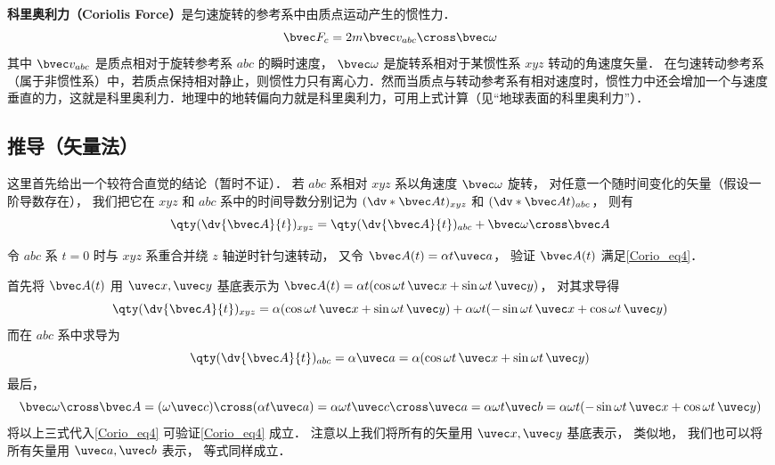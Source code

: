 
\textbf{科里奥利力（Coriolis Force）}是匀速旋转的参考系中由质点运动产生的惯性力．
\begin{equation}
\bvec F_c = 2m \bvec v_{abc} \cross \bvec \omega
\end{equation}
其中 $\bvec v_{abc}$ 是质点相对于旋转参考系 $abc$ 的瞬时速度， $\bvec\omega$ 是旋转系相对于某惯性系 $xyz$ 转动的角速度矢量．%
在匀速转动参考系（属于非惯性系）中，若质点保持相对静止，则惯性力只有离心力．然而当质点与转动参考系有相对速度时，惯性力中还会增加一个与速度垂直的力，这就是科里奥利力．地理中的地转偏向力就是科里奥利力，可用上式计算（见“地球表面的科里奥利力”）．

\subsection{推导（矢量法）}

这里首先给出一个较符合直觉的结论（暂时不证）． 若 $abc$ 系相对 $xyz$ 系以角速度 $\bvec\omega$ 旋转， 对任意一个随时间变化的矢量（假设一阶导数存在）， 我们把它在 $xyz$ 和 $abc$ 系中的时间导数分别记为 $(\dv*{\bvec A}{t})_{xyz}$ 和 $(\dv*{\bvec A}{t})_{abc}$， 则有
\begin{equation}\label{Corio_eq4}
\qty(\dv{\bvec A}{t})_{xyz} = \qty(\dv{\bvec A}{t})_{abc} + \bvec\omega\cross\bvec A
\end{equation}

\begin{example}{}
令 $abc$ 系 $t = 0$ 时与 $xyz$ 系重合并绕 $z$ 轴逆时针匀速转动， 又令 $\bvec A(t) = \alpha t \uvec a$， 验证 $\bvec A(t)$ 满足\autoref{Corio_eq4}．

首先将 $\bvec A(t)$ 用 $\uvec x, \uvec y$ 基底表示为 $\bvec A(t) = \alpha t (\cos\omega t\, \uvec x + \sin\omega t\, \uvec y)$， 对其求导得
\begin{equation}
\qty(\dv{\bvec A}{t})_{xyz} = \alpha (\cos\omega t \,\uvec x + \sin\omega t \,\uvec y)
+ \alpha\omega t (-\sin\omega t \,\uvec x + \cos\omega t \,\uvec y)
\end{equation}
而在 $abc$ 系中求导为
\begin{equation}
\qty(\dv{\bvec A}{t})_{abc} = \alpha \uvec a = \alpha (\cos\omega t\, \uvec x + \sin\omega t \,\uvec y)
\end{equation}
最后，
\begin{equation}
\bvec\omega \cross \bvec A = (\omega \uvec c) \cross (\alpha t \uvec a) = \alpha\omega t \uvec c\cross\uvec a = \alpha\omega t \uvec b = \alpha\omega t(-\sin \omega t \,\uvec x + \cos\omega t \,\uvec y)
\end{equation}
将以上三式代入\autoref{Corio_eq4} 可验证\autoref{Corio_eq4} 成立． 注意以上我们将所有的矢量用 $\uvec x, \uvec y$ 基底表示， 类似地， 我们也可以将所有矢量用 $\uvec a, \uvec b$ 表示， 等式同样成立．
\end{example}

